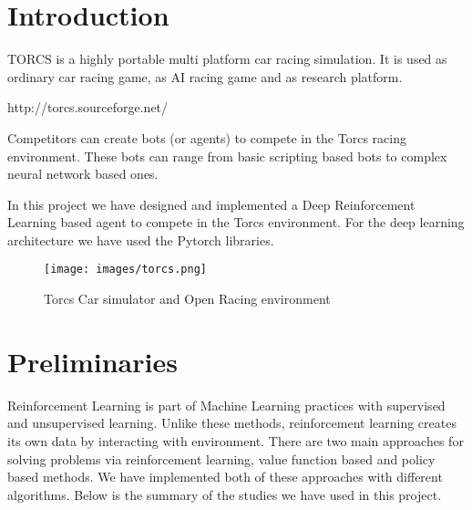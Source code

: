 \documentclass[conference]{IEEEtran}
\begin{document}


%
\IEEEpeerreviewmaketitle



\section{Introduction}

TORCS is a highly portable multi platform car racing simulation. It is used as ordinary car racing game, as AI racing game and as research platform.

http://torcs.sourceforge.net/

Competitors can create bots (or agents) to compete in the Torcs racing environment. These bots can range from basic scripting based bots to  complex neural network based ones.\

In this project we have designed and implemented a Deep Reinforcement Learning based agent to compete in the Torcs environment. For the deep learning architecture we have used the Pytorch libraries.\




\begin{figure}[t]
  \texttt{[image: images/torcs.png]}
  \caption{Torcs Car simulator and Open Racing environment }
\end{figure}




\section{Preliminaries}
Reinforcement Learning is part of Machine Learning practices with supervised and unsupervised learning. Unlike these methods, reinforcement learning creates its own data by interacting with environment. There are two main approaches for solving problems via reinforcement learning, value function based and policy based methods. We have implemented both of these approaches with different algorithms. Below is the summary of the studies we have used in this project.
\end{document}
